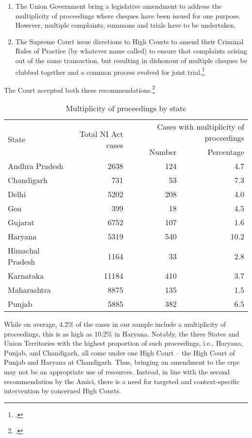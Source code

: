 \begin{enumerate}
 \item The Union Government bring a legislative amendment to address the multiplicity of proceedings where cheques have been issued for one purpose. However, multiple complaints, summons and trials have to be undertaken. 
 \item The Supreme Court issue directions to High Courts to amend their Criminal Rules of Practice (by whatever name called) to ensure that complaints arising out of the same transaction, but resulting in dishonour of multiple cheques be clubbed together and a common process evolved for joint trial.\footcite{amicus2020_submission}
\end{enumerate}

The Court accepted both these recommendations.\footcite{sc2020_138}

\begin{longtable}[h!]{@{}lrrr@{}}
  \caption{Multiplicity of proceedings by state}\label{tab:state_multiplicity}\\
\toprule
\multirow{2}{*}{State} &  \multirow{2}{*}{Total NI Act cases} & \multicolumn{2}{p{4cm}}{Cases with multiplicity of proceedings} \\
        &        & Number & Percentage \\
\midrule
\endhead
Andhra Pradesh   &   2638 &  124 &   4.7 \\
Chandigarh       &    731 &   53 &   7.3 \\
Delhi            &   5202 &  208 &   4.0 \\
Goa              &    399 &   18 &   4.5 \\
Gujarat          &   6752 &  107 &   1.6 \\
Haryana          &   5319 &  540 &  10.2 \\
Himachal Pradesh &   1164 &   33 &   2.8 \\
Karnataka        &  11184 &  410 &   3.7 \\
Maharashtra      &   8875 &  135 &   1.5 \\
Punjab           &   5885 &  382 &   6.5 \\
\bottomrule
\end{longtable}

While on average, 4.2\% of the cases in our sample include a multiplicity of proceedings, this is as high as 10.2\% in Haryana. Notably, the three States and Union Territories with the highest proportion of such proceedings, i.e., Haryana, Punjab, and Chandigarh, all come under one High Court -- the High Court of Punjab and Haryana at Chandigarh. Thus, bringing an amendment to the \gls{crpc} may not be an appropriate use of resources. Instead, in line with the second recommendation by the Amici, there is a need for targeted and context-specific intervention by concerned High Courts.

